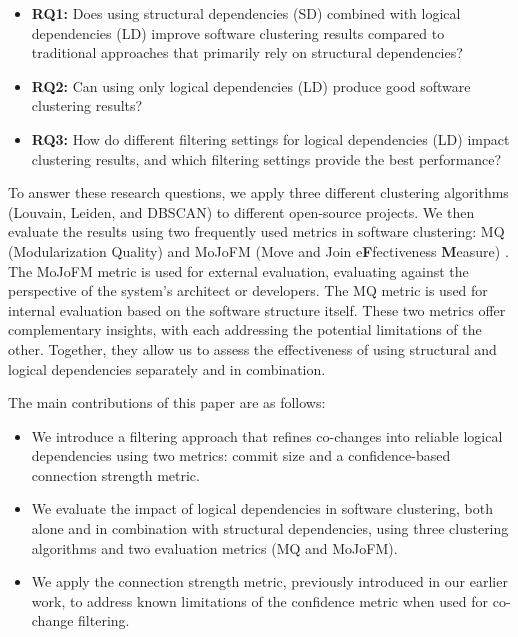 \documentclass{ieeeaccess}
\begin{document}
\begin{itemize}
\item \textbf{RQ1:} Does using structural dependencies (SD) combined with logical dependencies (LD) improve software clustering results compared to traditional approaches that primarily rely on structural dependencies?
\item \textbf{RQ2:} Can using only logical dependencies (LD) produce good software clustering results?
\item \textbf{RQ3:} How do different filtering settings for logical dependencies (LD) impact clustering results, and which filtering settings provide the best performance?
\end{itemize}

To answer these research questions, we apply three different clustering algorithms (Louvain, Leiden, and DBSCAN) to different open-source projects. We then evaluate the results using two frequently used metrics in software clustering:  MQ (Modularization Quality) \cite{b10} and MoJoFM (Move and Join e\textbf{F}fectiveness \textbf{M}easure) \cite{mojofm}. The MoJoFM metric is used for external evaluation, evaluating against the perspective of the system's architect or developers. The MQ metric is used for internal evaluation based on the software structure itself. These two metrics offer complementary insights, with each addressing the potential limitations of the other. Together, they allow us to assess the effectiveness of using structural and logical dependencies separately and in combination.

The main contributions of this paper are as follows:
\begin{itemize}
  \item We introduce a filtering approach that refines co-changes into reliable logical dependencies using two metrics: commit size and a confidence-based connection strength metric.
  \item We evaluate the impact of logical dependencies in software clustering, both alone and in combination with structural dependencies, using three clustering algorithms and two evaluation metrics (MQ and MoJoFM).
  \item We apply the connection strength metric, previously introduced in our earlier work, to address known limitations of the confidence metric when used for co-change filtering.
\end{itemize}
\end{document}
